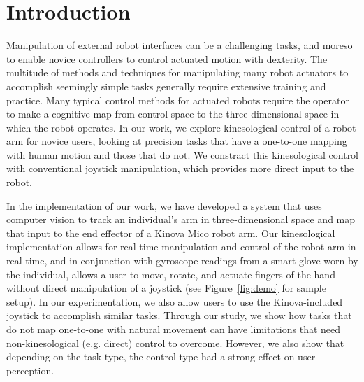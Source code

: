 \documentclass{sigchi}
\begin{document}


\section{Introduction}

Manipulation of external robot interfaces can be a challenging tasks, and moreso to enable novice controllers to control actuated motion with dexterity.  The multitude of methods and techniques for manipulating many robot actuators to accomplish seemingly simple tasks generally require extensive training and practice.  Many typical control methods for actuated robots require the operator to make a cognitive map from control space to the three-dimensional space in which the robot operates.  In our work, we explore kinesological control of a robot arm for novice users, looking at precision tasks that have a one-to-one mapping with human motion and those that do not.  We constract this kinesological control with conventional joystick manipulation, which provides more direct input to the robot.  

In the implementation of our work, we have developed a system that uses computer vision to track an individual's arm in three-dimensional space and map that input to the end effector of a Kinova Mico robot arm.  Our kinesological implementation allows for real-time manipulation and control of the robot arm in real-time, and in conjunction with gyroscope readings from a smart glove worn by the individual, allows a user to move, rotate, and actuate fingers of the hand without direct manipulation of a joystick (see Figure~\ref{fig:demo} for sample setup). In our experimentation, we also allow users to use the Kinova-included joystick to accomplish similar tasks. Through our study, we show how tasks that do not map one-to-one with natural movement can have limitations that need non-kinesological (e.g. direct) control to overcome.  However, we also show that depending on the task type, the control type had a strong effect on user perception.
\end{document}
